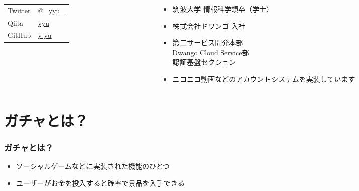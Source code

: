 \begin{frame}
\begin{columns}
\begin{column}{0.4\textwidth}
      \begin{table}[h]
        \begin{tabular}{ll}
          Twitter & \href{https://twitter.com/\_yyu\_}{@\_yyu\_} \\
          Qiita &  \href{https://qiita.com/yyu}{yyu} \\
          GitHub &  \href{https://github.com/y-yu}{y-yu} \\
        \end{tabular}
      \end{table}
    \end{column}
    \begin{column}{0.6\textwidth}
      \begin{itemize}
        \item<2-> 筑波大学 情報科学類卒（学士）
        \item<3-> 株式会社ドワンゴ 入社
        \item<4-> 第二サービス開発本部 \\
          Dwango Cloud Service部 \\
          認証基盤セクション
        \item<5-> ニコニコ動画などのアカウントシステムを実装しています
      \end{itemize}
    \end{column}
  \end{columns}
\end{frame}

\section{ガチャとは？}

\begin{frame}
  \frametitle{ガチャとは？}

  \begin{itemize}
    \item<2-> ソーシャルゲームなどに実装された機能のひとつ
    \item<3-> ユーザーがお金を投入すると確率で景品を入手できる
  \end{itemize}

  \begin{center}


  \end{center}
\end{frame}

